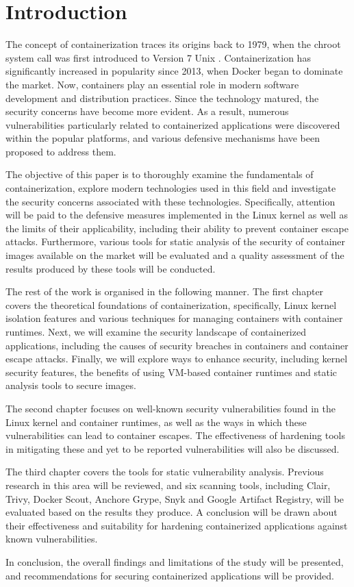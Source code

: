 \section{Introduction}

The concept of containerization traces its origins back to 1979, when the chroot system call was first introduced to Version 7 Unix \cite{1}. Containerization has significantly increased in popularity since 2013, when Docker began to dominate the market. Now, containers play an essential role in modern software development and distribution practices. Since the technology matured, the security concerns have become more evident. As a result, numerous vulnerabilities particularly related to containerized applications were discovered within the popular platforms, and various defensive mechanisms have been proposed to address them.

The objective of this paper is to thoroughly examine the fundamentals of containerization, explore modern technologies used in this field and investigate the security concerns associated with these technologies. Specifically, attention will be paid to the defensive measures implemented in the Linux kernel as well as the limits of their applicability, including their ability to prevent container escape attacks. Furthermore, various tools for static analysis of the security of container images available on the market will be evaluated and a quality assessment of the results produced by these tools will be conducted.

The rest of the work is organised in the following manner. The first chapter covers the theoretical foundations of containerization, specifically, Linux kernel isolation features and various techniques for managing containers with container runtimes. Next, we will examine the security landscape of containerized applications, including the causes of security breaches in containers and container escape attacks. Finally, we will explore ways to enhance security, including kernel security features, the benefits of using VM-based container runtimes and static analysis tools to secure images.

The second chapter focuses on well-known security vulnerabilities found in the Linux kernel and container runtimes, as well as the ways in which these vulnerabilities can lead to container escapes. The effectiveness of hardening tools in mitigating these and yet to be reported vulnerabilities will also be discussed.

The third chapter covers the tools for static vulnerability analysis. Previous research in this area will be reviewed, and six scanning tools, including Clair, Trivy, Docker Scout, Anchore Grype, Snyk and Google Artifact Registry, will be evaluated based on the results they produce. A conclusion will be drawn about their effectiveness and suitability for hardening containerized applications against known vulnerabilities.

In conclusion, the overall findings and limitations of the study will be presented, and recommendations for securing containerized applications will be provided.
